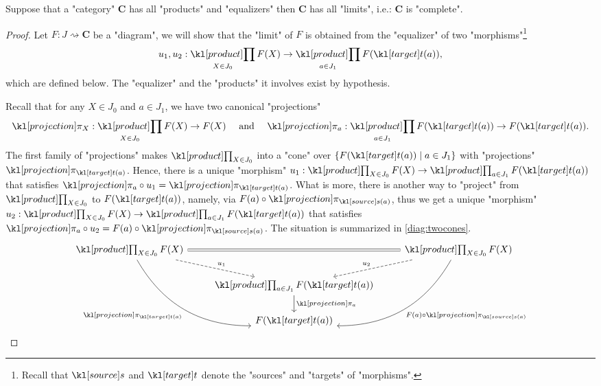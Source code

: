 \documentclass[main.tex]{subfiles}
\begin{document}
\begin{thm}\label{thm:prodeqcomplete}
    Suppose that a "category" $\mathbf{C}$ has all "products" and "equalizers" then $\mathbf{C}$ has all "limits", i.e.: $\mathbf{C}$ is "complete". %
\end{thm}
\begin{proof}
    Let $F: J\rightsquigarrow \mathbf{C}$ be a "diagram", we will show that the "limit" of $F$ is obtained from the "equalizer" of two "morphisms"\footnote{Recall that $\source$ and $\target$ denote the "sources" and "targets" of "morphisms".}
    \[u_1, u_2: \Product_{X \in J_0} F(X) \rightarrow \Product_{a \in J_1} F(\target(a)),\]
    which are defined below. The "equalizer" and the "products" it involves exist by hypothesis.
    
    Recall that for any $X \in J_0$ and $a \in J_1$, we have two canonical "projections" \[\projection_X:\Product_{X \in J_0}F(X)\rightarrow F(X) \quad \text{ and }\quad \projection_a:\Product_{a \in J_1} F(\target(a)) \rightarrow F(\target(a)).\]
    The first family of "projections" makes $\Product_{X \in J_0}$ into a "cone" over $\{F(\target(a)) \mid a \in J_1\}$ with "projections" $\projection_{\target(a)}$. Hence, there is a unique "morphism" $u_1:\Product_{X \in J_0} F(X) \rightarrow \Product_{a \in J_1}F(\target(a))$ that satisfies $\projection_a \circ u_1 = \projection_{\target(a)}$. What is more, there is another way to "project" from $\Product_{X \in J_0}$ to $F(\target(a))$, namely, via $F(a) \circ \projection_{\source(a)}$, thus we get a unique "morphism" $u_2:\Product_{X \in J_0} F(X) \rightarrow \Product_{a \in J_1}F(\target(a))$ that satisfies $\projection_a \circ u_2 = F(a) \circ \projection_{\source(a)}$. The situation is summarized in \eqref{diag:twocones}.
    \begin{equation}\label{diag:twocones}
        \begin{tikzcd}
            \Product_{X \in J_0} F(X) \arrow[rdd, "\projection_{\target(a)}"', bend right] \arrow[rd, "u_1", dashed] \arrow[rr, equal] & & \Product_{X \in J_0} F(X) \arrow[ldd, "F(a) \circ \projection_{\source(a)}", bend left] \arrow[ld, "u_2"', dashed] \\& \Product_{a \in J_1} F(\target(a)) \arrow[d, "\projection_{a}"] &\\ & F(\target(a)) &         
            \end{tikzcd}
    \end{equation}
    

\end{proof}
\end{document}
